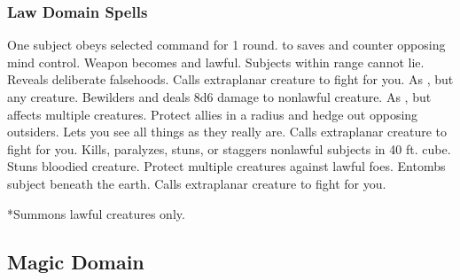 \subsubsection{Law Domain Spells}
\begin{spelllist}
   One subject obeys selected command for 1 round.
    to saves and counter opposing mind control.
   Weapon becomes  and lawful.
   Subjects within range cannot lie.
   Reveals deliberate falsehoods.
   Calls extraplanar creature to fight for you.
   As , but any creature.
   Bewilders and deals 8d6 damage to nonlawful creature.
   As , but affects multiple creatures.
   Protect allies in a \areamed radius and hedge out opposing outsiders.
  \M Lets you see all things as they really are.
   Calls extraplanar creature to fight for you.
   Kills, paralyzes, stuns, or staggers nonlawful subjects in 40 ft. cube.
   Stuns bloodied creature.
  \spellhead[8]{}
  \F Protect multiple creatures against lawful foes.
   Entombs subject beneath the earth.
   Calls extraplanar creature to fight for you.
\end{spelllist}
*Summons lawful creatures only.

\subsection{Magic Domain}

